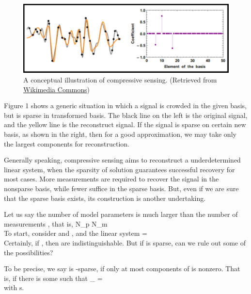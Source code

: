 \bigskip
\begin {figure} [hbt]
\centering
\includegraphics [width = \textwidth] {compressive-sensing.png}
\caption {
A conceptual illustration of compressive sensing.
(Retrieved from \href {commons.wikimedia.org/wiki/File:Orthogonal_Matching_Pursuit.gif} {Wikimedia Commons})
}
\end {figure}
\bigskip

Figure 1 shows a generic situation in which a signal is crowded in the given basis, but is sparse in transformed basis.
The black line on the left is the original signal, and the yellow line is the reconstruct signal.
If the signal is sparse on certain new basis, as shown in the right, then for a good approximation, we may take only the largest components for reconstruction.

Generally speaking, compressive sensing aims to reconstruct a underdetermined linear system, when the sparsity of solution guarantees successful recovery for most cases.
More measurements are required to recover the signal in the nonsparse basis, while fewer suffice in the sparse basis.
But, even if we are sure that the sparse basis exists, its construction is another undertaking.

Let us say the number of model parameters  is much larger than the number of measurements , that is,
%
 {
N_p \gg N_m \\
}
%
To start, consider  and , and the linear system
%
 {
=  \\
}
Certainly, if , then  are indistinguishable.
But if  is sparse, can we rule out some of the possibilities?

To be precise, we say  is -sparse, if only at most  components of  is nonzero.
That is, if there is some  such that
%
 {
 _{}
= \\
}
%
with
%
 {
 \leq s. \\
}

